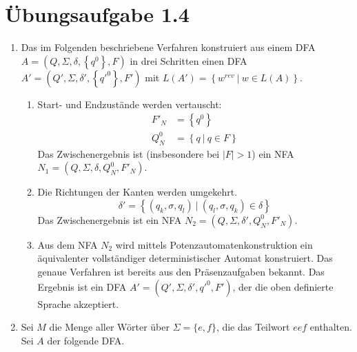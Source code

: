 \documentclass[a4paper]{scrartcl}
\begin{document}
\section*{Übungsaufgabe 1.4}
\begin{enumerate}
    \item
        Das im Folgenden beschriebene Verfahren konstruiert aus einem DFA
        $A = \left( Q, \Sigma, \delta, \left\{ q^0 \right\}, F \right)$
        in drei Schritten einen DFA
        $A' = \left( Q', \Sigma, \delta', \left\{ q'^0 \right\}, F' \right)$
        mit $L(A') = \left\{ w^{rev} \ |\ w \in L(A) \right\}$.

        \begin{enumerate}[1.]
            \item
                Start- und Endzustände werden vertauscht:
                \begin{align*}
                    F'_N  &= \left\{ q^0 \right\} \\
                    Q^0_N &= \left\{ q \ |\ q \in F \right\}
                \end{align*}
                Das Zwischenergebnis ist (insbesondere bei $|F| > 1$) ein NFA 
                $N_1 = \left( Q, \Sigma, \delta, Q^0_N, F'_N \right)$.

            \item
                Die Richtungen der Kanten werden umgekehrt.
                \begin{equation*}
                    \delta' = \left\{ (q_k, \sigma, q_l)
                    \ |\ (q_l, \sigma, q_k) \in \delta \right\}
                \end{equation*}
                Das Zwischenergebnis ist ein NFA
                $N_2 = \left( Q, \Sigma, \delta', Q^0_N, F'_N \right)$.

            \item
                Aus dem NFA $N_2$ wird mittels Potenzautomatenkonstruktion ein
                äquivalenter vollständiger deterministischer Automat
                konstruiert.
                Das genaue Verfahren ist bereits aus den Präsenzaufgaben bekannt.
                Das Ergebnis ist ein DFA
                $A' = \left( Q', \Sigma, \delta', {q'^0}, F' \right)$,
                der die oben definierte Sprache akzeptiert.
        \end{enumerate}

    \item
        Sei $M$ die Menge aller Wörter über $\Sigma = \{ e, f \}$, die das
        Teilwort $eef$ enthalten.
        Sei $A$ der folgende DFA.
        \begin{center}
\end{center}
\end{enumerate}
\end{document}
